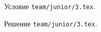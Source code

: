 \problem{}
Условие \texttt{team/junior/3.tex}.

\solution Решение \texttt{team/junior/3.tex}.
\endproblem
